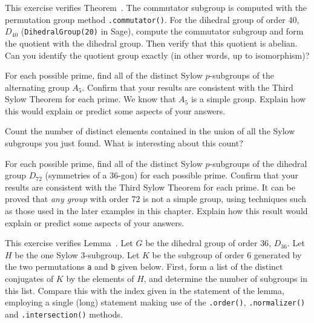 \begin{sageverbatim}\end{sageverbatim}
%
%
This exercise verifies Theorem~.  The commutator subgroup is computed with the permutation group method \verb?.commutator()?.  For the dihedral group of order 40, $D_{40}$ (\verb?DihedralGroup(20)? in Sage), compute the commutator subgroup and form the quotient with the dihedral group.  Then verify that this quotient is abelian.  Can you identify the quotient group exactly (in other words, up to isomorphism)?
\begin{sageverbatim}\end{sageverbatim}
%
%
For each possible prime, find all of the distinct Sylow $p$-subgroups of the alternating group $A_5$.  Confirm that your results are consistent with the Third Sylow Theorem for each prime.  We know that $A_5$ is a simple group.  Explain how this would explain or predict some aspects of your answers.\par
%
Count the number of distinct elements contained in the union of all the Sylow subgroups you just found.  What is interesting about this count?
\begin{sageverbatim}\end{sageverbatim}
%
%
For each possible prime, find all of the distinct Sylow $p$-subgroups of the dihedral group $D_{72}$ (symmetries of a $36$-gon) for each possible prime.  Confirm that your results are consistent with the Third Sylow Theorem for each prime.  It can be proved that {\em any group} with order $72$ is not a simple group, using techniques such as those used in the later examples in this chapter.  Explain how this result would explain or predict some aspects of your answers.\begin{sageverbatim}\end{sageverbatim}
%
%
This exercise verifies Lemma~.  Let $G$ be the dihedral group of order $36$, $D_{36}$.  Let $H$ be the one Sylow $3$-subgroup.  Let $K$ be the subgroup of order $6$ generated by the two permutations \verb?a? and \verb?b? given below.  First, form a list of the distinct conjugates of $K$ by the elements of $H$, and determine the number of subgroups in this list.  Compare this with the index given in the statement of the lemma, employing a single (long) statement making use of the \verb?.order()?, \verb?.normalizer()? and \verb?.intersection()? methods.\par

